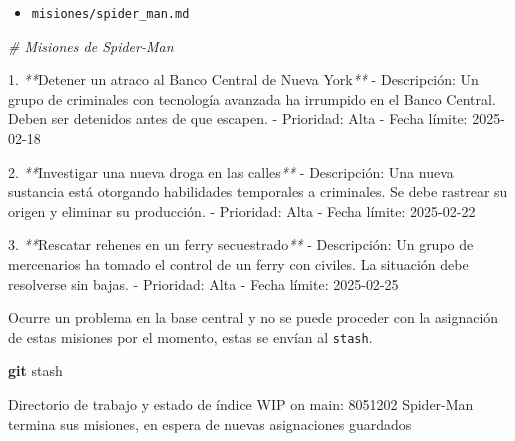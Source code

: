 \documentclass[
]{book}
\newenvironment{Shaded}{\begin{snugshade}}{\end{snugshade}}
\newcommand{\CommentTok}[1]{\textcolor[rgb]{0.56,0.35,0.01}{\textit{#1}}}
\newcommand{\ExtensionTok}[1]{#1}
\newcommand{\FunctionTok}[1]{\textcolor[rgb]{0.13,0.29,0.53}{\textbf{#1}}}
\newcommand{\NormalTok}[1]{#1}
\newcommand{\PreprocessorTok}[1]{\textcolor[rgb]{0.56,0.35,0.01}{\textit{#1}}}
\providecommand{\tightlist}{%
  \setlength{\itemsep}{0pt}\setlength{\parskip}{0pt}}
\begin{document}
\begin{itemize}
\tightlist
\item
  \texttt{misiones/spider\_man.md}
\end{itemize}

\begin{Shaded}
\begin{Highlighting}[]
\CommentTok{\# Misiones de Spider{-}Man}

\ExtensionTok{1.} \PreprocessorTok{**}\NormalTok{Detener un atraco al Banco Central de Nueva York}\PreprocessorTok{**}
   \ExtensionTok{{-}}\NormalTok{ Descripción: Un grupo de criminales con tecnología avanzada ha irrumpido en el Banco Central. Deben ser detenidos antes de que escapen.}
   \ExtensionTok{{-}}\NormalTok{ Prioridad: Alta}
   \ExtensionTok{{-}}\NormalTok{ Fecha límite: 2025{-}02{-}18}

\ExtensionTok{2.} \PreprocessorTok{**}\NormalTok{Investigar una nueva droga en las calles}\PreprocessorTok{**}
   \ExtensionTok{{-}}\NormalTok{ Descripción: Una nueva sustancia está otorgando habilidades temporales a criminales. Se debe rastrear su origen y eliminar su producción.}
   \ExtensionTok{{-}}\NormalTok{ Prioridad: Alta}
   \ExtensionTok{{-}}\NormalTok{ Fecha límite: 2025{-}02{-}22}

\ExtensionTok{3.} \PreprocessorTok{**}\NormalTok{Rescatar rehenes en un ferry secuestrado}\PreprocessorTok{**}
   \ExtensionTok{{-}}\NormalTok{ Descripción: Un grupo de mercenarios ha tomado el control de un ferry con civiles. La situación debe resolverse sin bajas.}
   \ExtensionTok{{-}}\NormalTok{ Prioridad: Alta}
   \ExtensionTok{{-}}\NormalTok{ Fecha límite: 2025{-}02{-}25}
\end{Highlighting}
\end{Shaded}

Ocurre un problema en la base central y no se puede proceder con la asignación de estas misiones por el momento, estas se envían al \texttt{stash}.

\begin{Shaded}
\begin{Highlighting}[]
\FunctionTok{git}\NormalTok{ stash}
\end{Highlighting}
\end{Shaded}

\begin{Shaded}
\begin{Highlighting}[]
\ExtensionTok{Directorio}\NormalTok{ de trabajo y estado de índice WIP on main: 8051202 Spider{-}Man termina sus misiones, en espera de nuevas asignaciones guardados}
\end{Highlighting}
\end{Shaded}
\end{document}
